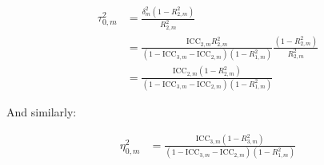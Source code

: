 \documentclass[12pt]{article}
\begin{document}
\begin{align*}
\tau^2_{0,m}  &= \frac{\delta_m^2(1 - R_{2,m}^2)}{R_{2,m}^2}\\
&= \frac{\text{ICC}_{2,m}R_{2,m}^2}{(1 - \text{ICC}_{3,m}- \text{ICC}_{2,m})(1-R_{1,m}^2)}\frac{(1 - R_{2,m}^2)}{R_{2,m}^2}\\
&= \frac{\text{ICC}_{2,m}(1-R_{2,m}^2)}{(1 - \text{ICC}_{3,m}- \text{ICC}_{2,m})(1-R_{1,m}^2)}
\end{align*}

And similarly:

\begin{align*}
\eta^2_{0,m} &= \frac{\text{ICC}_{3,m}(1-R_{3,m}^2)}{(1 - \text{ICC}_{3,m}- \text{ICC}_{2,m})(1-R_{1,m}^2)}
\end{align*}



\newpage

%
\end{document}
